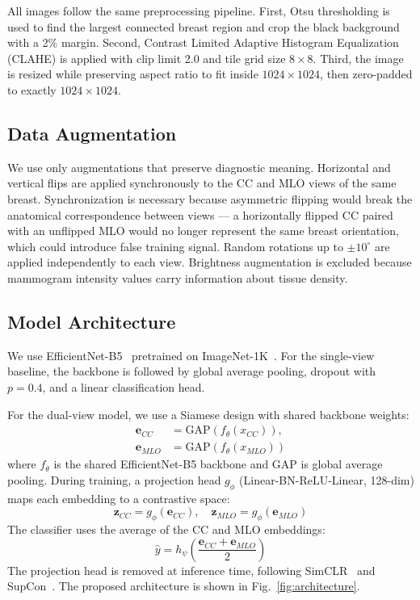 \documentclass[runningheads]{llncs}
\begin{document}
All images follow the same preprocessing pipeline. First, Otsu thresholding is used to find the largest connected breast region and crop the black background with a 2\% margin. Second, Contrast Limited Adaptive Histogram Equalization (CLAHE) is applied with clip limit 2.0 and tile grid size $8\times8$. Third, the image is resized while preserving aspect ratio to fit inside $1024\times1024$, then zero-padded to exactly $1024\times1024$.

\subsection{Data Augmentation}

We use only augmentations that preserve diagnostic meaning. Horizontal and vertical flips are applied synchronously to the CC and MLO views of the same breast. Synchronization is necessary because asymmetric flipping would break the anatomical correspondence between views --- a horizontally flipped CC paired with an unflipped MLO would no longer represent the same breast orientation, which could introduce false training signal. Random rotations up to $\pm10^{\circ}$ are applied independently to each view. Brightness augmentation is excluded because mammogram intensity values carry information about tissue density.

\subsection{Model Architecture}

We use EfficientNet-B5~\cite{tan2019efficientnet} pretrained on ImageNet-1K~\cite{deng2009imagenet}. For the single-view baseline, the backbone is followed by global average pooling, dropout with $p=0.4$, and a linear classification head.

For the dual-view model, we use a Siamese design with shared backbone weights:
\begin{equation}
\begin{split}
\mathbf{e}_{CC} &= \text{GAP}(f_\theta(x_{CC})), \\
\mathbf{e}_{MLO} &= \text{GAP}(f_\theta(x_{MLO}))
\end{split}
\end{equation}
where $f_\theta$ is the shared EfficientNet-B5 backbone and GAP is global average pooling. During training, a projection head $g_\phi$ (Linear-BN-ReLU-Linear, 128-dim) maps each embedding to a contrastive space:
\begin{equation}
\mathbf{z}_{CC} = g_\phi(\mathbf{e}_{CC}), \quad \mathbf{z}_{MLO} = g_\phi(\mathbf{e}_{MLO})
\end{equation}
The classifier uses the average of the CC and MLO embeddings:
\begin{equation}
\hat{y} = h_\psi\!\left(\frac{\mathbf{e}_{CC} + \mathbf{e}_{MLO}}{2}\right)
\end{equation}
The projection head is removed at inference time, following SimCLR~\cite{chen2020simclr} and SupCon~\cite{khosla2020supcon}. The proposed architecture is shown in Fig.~\ref{fig:architecture}.
\end{document}
